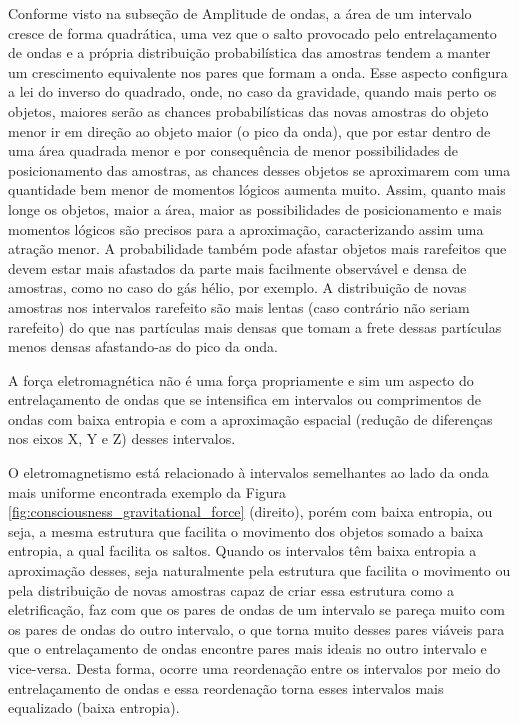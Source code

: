 Conforme visto na subseção de Amplitude de ondas, a área de um intervalo cresce de forma quadrática, uma vez que o salto provocado pelo entrelaçamento de ondas e a própria distribuição probabilística das amostras tendem a manter um crescimento equivalente nos pares que formam a onda. Esse aspecto configura a lei do inverso do quadrado, onde, no caso da gravidade, quando mais perto os objetos, maiores serão as chances probabilísticas das novas amostras do objeto menor ir em direção ao objeto maior (o pico da onda), que por estar dentro de uma área quadrada menor e por consequência de menor possibilidades de posicionamento das amostras, as chances desses objetos se aproximarem com uma quantidade bem menor de momentos lógicos aumenta muito. Assim, quanto mais longe os objetos, maior a área, maior as possibilidades de posicionamento e mais momentos lógicos são precisos para a aproximação, caracterizando assim uma atração menor. A probabilidade também pode afastar objetos mais rarefeitos que devem estar mais afastados da parte mais facilmente observável e densa de amostras, como no caso do gás hélio, por exemplo. A distribuição de novas amostras nos intervalos rarefeito são mais lentas (caso contrário não seriam rarefeito) do que nas partículas mais densas que tomam a frete dessas partículas menos densas afastando-as do pico da onda. 

A força eletromagnética não é uma força propriamente e sim um aspecto do entrelaçamento de ondas que se intensifica em intervalos ou comprimentos de ondas com baixa entropia e com a aproximação espacial (redução de diferenças nos eixos X, Y e Z) desses intervalos.

O eletromagnetismo está relacionado à intervalos semelhantes ao lado da onda mais uniforme encontrada exemplo da Figura \ref{fig:consciousness_gravitational_force} (direito), porém com baixa entropia, ou seja, a mesma estrutura que facilita o movimento dos objetos somado a baixa entropia, a qual facilita os saltos. Quando os intervalos têm baixa entropia a aproximação desses, seja naturalmente pela estrutura que facilita o movimento ou pela distribuição de novas amostras capaz de criar essa estrutura como a eletrificação, faz com que os pares de ondas de um intervalo se pareça muito com os pares de ondas do outro intervalo, o que torna muito desses pares viáveis para que o entrelaçamento de ondas encontre pares mais ideais no outro intervalo e vice-versa. Desta forma, ocorre uma reordenação entre os intervalos por meio do entrelaçamento de ondas e essa reordenação torna esses intervalos mais equalizado (baixa entropia).

